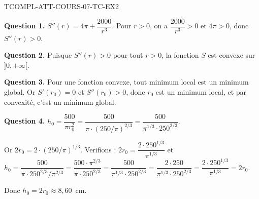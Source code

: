 \begin{corrige}{TCOMPL-ATT-COURS-07-TC-EX2}

\textbf{Question 1.} $S''(r) = 4\pi + \dfrac{2000}{r^3}$. Pour $r > 0$, on a $\dfrac{2000}{r^3} > 0$ et $4\pi > 0$, donc $S''(r) > 0$.

\textbf{Question 2.} Puisque $S''(r) > 0$ pour tout $r > 0$, la fonction $S$ est convexe sur $]0, +\infty[$.

\textbf{Question 3.} Pour une fonction convexe, tout minimum local est un minimum global. Or $S'(r_0) = 0$ et $S''(r_0) > 0$, donc $r_0$ est un minimum local, et par convexité, c'est un minimum global.

\textbf{Question 4.} $h_0 = \dfrac{500}{\pi r_0^2} = \dfrac{500}{\pi \cdot (250/\pi)^{2/3}} = \dfrac{500}{\pi^{1/3} \cdot 250^{2/3}}$.

Or $2r_0 = 2 \cdot (250/\pi)^{1/3}$. Verifions : $2r_0 = \dfrac{2 \cdot 250^{1/3}}{\pi^{1/3}}$ et $h_0 = \dfrac{500}{\pi \cdot 250^{2/3}/\pi^{2/3}} = \dfrac{500 \cdot \pi^{2/3}}{\pi \cdot 250^{2/3}} = \dfrac{500}{\pi^{1/3} \cdot 250^{2/3}} = \dfrac{2 \cdot 250}{\pi^{1/3} \cdot 250^{2/3}} = \dfrac{2 \cdot 250^{1/3}}{\pi^{1/3}} = 2r_0$.

Donc $h_0 = 2r_0 \approx 8{,}60$~cm.

\end{corrige}
